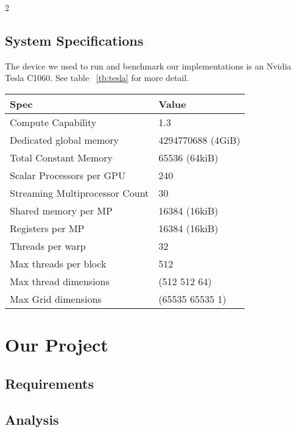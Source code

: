 \documentclass[10pt]{article}
\begin{document}
\begin{multicols}{2}
  \subsection{System Specifications}
  The device we used to run and benchmark our implementations is an Nvidia Tesla C1060.
  See table ~\ref{tb:tesla} for more detail.

  \begin{table*}[!ht]\centering
    \begin{tabular}{@{}l l@{}}\toprule
      \bf{Spec}                       &   \bf{Value}          \\
      \hline
      Compute Capability              &   1.3                 \\
      Dedicated global memory         &   4294770688 (4GiB)   \\
      Total Constant Memory           &   65536 (64kiB)       \\
      Scalar Processors per GPU       &   240                 \\
      Streaming Multiprocessor Count  &   30                  \\
      Shared memory per MP            &   16384 (16kiB)       \\
      Registers per MP                &   16384 (16kiB)       \\
      Threads per warp                &   32                  \\
      Max threads per block           &   512                 \\
      Max thread dimensions           &   (512 512 64)        \\
      Max Grid dimensions             &   (65535 65535 1)     \\
      \hline
    \end{tabular}
    \caption{Nvidia Tesla C1060 Specifications}
    \label{tb:tesla}
  \end{table*}

  \section{Our Project}
  \subsection{Requirements} %
  \subsection{Analysis} %

\end{multicols}
\end{document}
